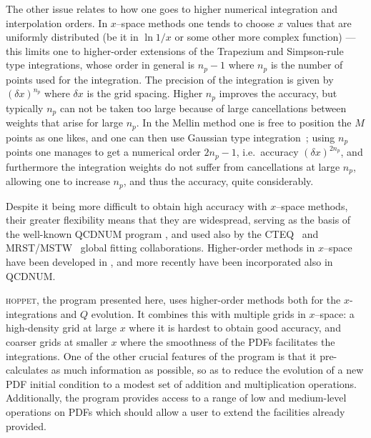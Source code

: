 \documentclass[12pt]{article}
\newcommand{\lp}{\left(}
\newcommand{\rp}{\right)}
\newcommand{\ie}{i.e.\ }
\newcommand{\hoppet}{\textsc{hoppet}\xspace}
\begin{document}
The other issue relates to how one goes to higher numerical
integration and interpolation orders.
In $x$--space methods one tends to choose $x$ values that are uniformly
distributed (be it in $\ln 1/x$ or some other more complex function)
--- this limits one to higher-order extensions of the Trapezium and
Simpson-rule type integrations, whose order in general is $n_p-1$
where $n_p$ is the number of points used for the integration. The
precision of the integration is given by $\lp\delta x\rp^{n_p}$ where
$\delta x$ is the grid spacing. Higher $n_p$ improves the accuracy,
but typically $n_p$ can not be taken too large because of large
cancellations between weights that arise for large $n_p$.
%
%
In the Mellin method one is free to position the $M$ points as one
likes, and one can then use Gaussian type
integration~\cite{Weinzierl:2002mv,Pegasus,Kosower:1997hg}; using $n_p$
points one manages to get a numerical order $2n_p-1$, \ie accuracy
$\lp \delta x\rp^{2n_p}$, and furthermore the integration weights do not suffer
from cancellations at large $n_p$, allowing one to increase
$n_p$, and thus the accuracy, quite considerably.

Despite it being more difficult to obtain high accuracy with $x$--space
methods, their greater flexibility means that they are widespread,
serving as the basis of the well-known  QCDNUM program \cite{Botje},
and  used also by the CTEQ~\cite{CTEQ} and MRST/MSTW~\cite{MRST}
global fitting
collaborations. Higher-order methods in $x$--space have been developed
in \cite{Schoeffel:1998tz,Pascaud:2001bi,Cafarella:2003jr,Cafarella:2005zj,Cafarella:2008du,GuzziThesis,Dasgupta:2001eq,Dasgupta:2002dc}, and
more recently have been incorporated also in QCDNUM.

\hoppet, the program presented here, uses higher-order methods both for
the $x$-integrations and $Q$ evolution. It combines this with multiple
grids in $x$--space: a high-density grid at large $x$ where it is
hardest to obtain good accuracy, and coarser grids at smaller $x$
where the smoothness of the PDFs facilitates the integrations. One of
the other crucial features of the program is that it pre-calculates as
much information as possible, so as to reduce the 
evolution of a new PDF initial condition to a modest set of addition
and multiplication operations. Additionally, the program provides
access to a range of low and medium-level operations on PDFs which
should allow a user to extend the facilities already provided.
\end{document}
